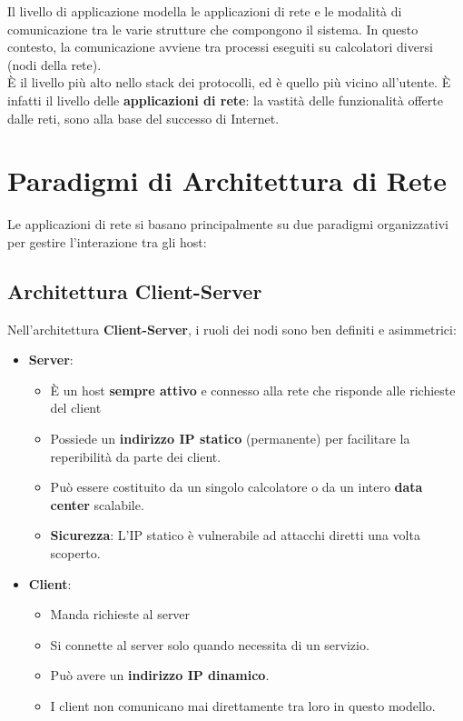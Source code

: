 \documentclass[12pt,a4paper,oneside]{book}
\begin{document}
Il livello di applicazione modella le applicazioni di rete e le modalità di comunicazione tra le varie strutture che compongono il sistema. In questo contesto, la comunicazione avviene tra processi eseguiti su calcolatori diversi (nodi della rete).\\
È  il livello più alto nello stack dei protocolli, ed è quello più vicino all’utente. È infatti il livello delle \textbf{applicazioni di rete}: la vastità delle funzionalità offerte dalle reti, sono alla base del successo di Internet.

\section{Paradigmi di Architettura di Rete}

Le applicazioni di rete si basano principalmente su due paradigmi organizzativi per gestire l'interazione tra gli host:

\subsection{Architettura Client-Server}

Nell'architettura \textbf{Client-Server}, i ruoli dei nodi sono ben definiti e asimmetrici:

\begin{itemize}
    \item \textbf{Server}:
    \begin{itemize}
        \item È un host \textbf{sempre attivo} e connesso alla rete che risponde alle richieste del client
        \item Possiede un \textbf{indirizzo IP statico} (permanente) per facilitare la reperibilità da parte dei client.
        \item Può essere costituito da un singolo calcolatore o da un intero \textbf{data center} scalabile.
        \item \textbf{Sicurezza}: L'IP statico è vulnerabile ad attacchi diretti una volta scoperto.
    \end{itemize}
    \item \textbf{Client}:
    \begin{itemize}
        \item Manda richieste al server
        \item Si connette al server solo quando necessita di un servizio.
        \item Può avere un \textbf{indirizzo IP dinamico}.
        \item I client non comunicano mai direttamente tra loro in questo modello.
    \end{itemize}
\end{itemize}
\end{document}
